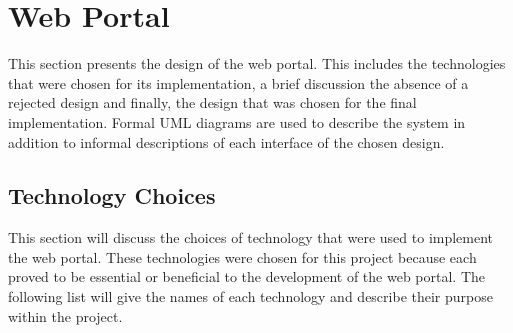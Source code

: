 \documentclass[11pt,a4paper]{report}
\begin{document}
\section{Web Portal}
\label{sec:web-portal-design}
This section presents the design of the web portal. This includes the technologies that were chosen for its implementation, a brief discussion the absence of a rejected design and finally, the design that was chosen for the final implementation. Formal UML diagrams are used to describe the system in addition to informal descriptions of each interface of the chosen design.

\subsection{Technology Choices}

\label{sec:portal-technology-choices}



This section will discuss the choices of technology that were used to implement the web portal. These technologies were chosen for this project because each proved to be essential or beneficial to the development of the web portal. The following list will give the names of each technology and describe their purpose within the project.
\end{document}
